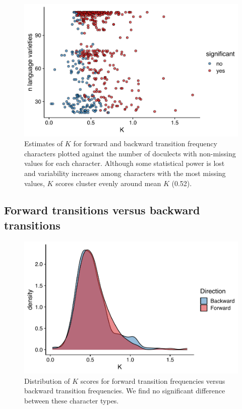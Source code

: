 \begin{figure}

{\centering \includegraphics[width=0.66\linewidth]{05-phylo-signal/fig/k-scatterplot} 

}

\caption{Estimates of $K$ for forward and backward transition frequency characters plotted against the number of doculects with non-missing values for each character. Although some statistical power is lost and variability increases among characters with the most missing values, $K$ scores cluster evenly around mean $K$ (0.52).}\label{fig:k-scatterplot}
\end{figure}

\hypertarget{fwd-vs-bkwd}{%
\subsection{Forward transitions versus backward transitions}\label{fwd-vs-bkwd}}

\begin{figure}

{\centering \includegraphics[width=0.66\linewidth]{05-phylo-signal/fig/k-fwd-bkwd} 

}

\caption{Distribution of $K$ scores for forward transition frequencies versus backward transition frequencies. We find no significant difference between these character types.}\label{fig:k-fwd-vs-bkwd}
\end{figure}

